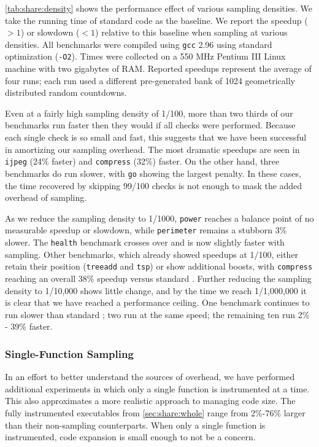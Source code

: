 \autoref{tab:share:density} shows the performance effect of various
sampling densities.  We take the running time of standard \CCured code
as the baseline.  We report the speedup ($>1$) or slowdown ($<1$)
relative to this baseline when sampling at various densities.  All
benchmarks were compiled using \texttt{gcc} 2.96 using standard
optimization (\texttt{-O2}).  Times were collected on a 550 MHz
Pentium III Linux machine with two gigabytes of RAM.  Reported
speedups represent the average of four runs; each run used a different
pre-generated bank of 1024 geometrically distributed random
countdowns.

Even at a fairly high sampling density of 1/100, more than two thirds
of our benchmarks run faster then they would if all checks were
performed.  Because each single check is so small and fast, this
suggests that we have been successful in amortizing our sampling
overhead.  The most dramatic speedups are seen in \texttt{ijpeg} (24\%
faster) and \texttt{compress} (32\%) faster.  On the other hand, three
benchmarks do run slower, with \texttt{go} showing the largest
penalty.  In these cases, the time recovered by skipping 99/100 checks
is not enough to mask the added overhead of sampling.

As we reduce the sampling density to 1/1000, \texttt{power} reaches a
balance point of no measurable speedup or slowdown, while
\texttt{perimeter} remains a stubborn 3\% slower.  The \texttt{health}
benchmark crosses over and is now slightly faster with sampling.
Other benchmarks, which already showed speedups at 1/100, either
retain their position (\texttt{treeadd} and \texttt{tsp}) or show
additional boosts, with \texttt{compress} reaching an overall 38\%
speedup versus standard \CCured.  Further reducing the sampling
density to 1/10,000 shows little change, and by the time we reach
1/1,000,000 it is clear that we have reached a performance ceiling.
One benchmark continues to run slower than standard \CCured; two run
at the same speed; the remaining ten run 2\% - 39\% faster.

\subsubsection{Single-Function Sampling}

In an effort to better understand the sources of overhead, we have
performed additional experiments in which only a single function is
instrumented at a time.  This also approximates a more realistic
approach to managing code size.  The fully instrumented executables
from \autoref{sec:share:whole} range from 2\%-76\% larger than their
non-sampling counterparts.  When only a single function is
instrumented, code expansion is small enough to not be a concern.

